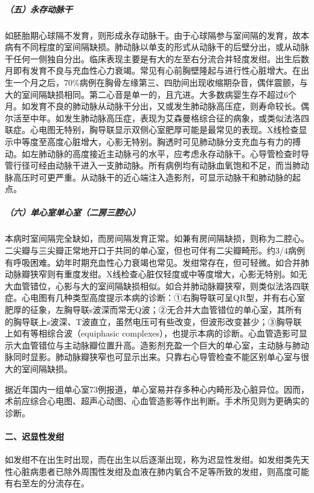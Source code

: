 \subparagraph{（五）永存动脉干}

如胚胎期心球隔不发育，则形成永存动脉干。由于心球隔参与室间隔的发育，故本病有不同程度的室间隔缺损。肺动脉以单支的形式从动脉干的后壁分出，或从动脉干任何一侧独自分出。临床表现主要是有大的左至右分流合并轻度发绀。出生后数月即有发育不良与充血性心力衰竭。常见有心前胸壁隆起与进行性心脏增大。在出生一个月之后，70\%病例在胸骨左缘第三、四肋间出现收缩期杂音，偶伴震颤，与大的室间隔缺损相同。第二心音是单一的，且亢进。大多数病婴生存不超过6个月。如发育不良的肺动脉从动脉干分出，又或发生肺动脉高压症，则寿命较长。偶尔活至中年。如发生肺动脉高压症，表现为艾森曼格综合征的病象，或类似法洛四联症。心电图无特别，胸导联显示双侧心室肥厚可能是最常见的表现。X线检查显示中等度至高度心脏增大，心影无特别。胸透时可见肺动脉分支充血与有力的搏动。如左肺动脉的高度接近主动脉弓的水平，应考虑永存动脉干。心导管检查时导管行径可经由动脉干进入一支肺动脉。所有病例均有动脉血氧饱和不足，而当肺动脉高压时可更严重。从动脉干的近心端注入造影剂，可显示动脉干和肺动脉的起点。

\subparagraph{（六）单心室单心室（二房三腔心）}

本病时室间隔完全缺如，而房间隔发育正常。如兼有房间隔缺损，则称为二腔心。二尖瓣与三尖瓣正常地开口于共同的单心室，但也可伴有二尖瓣畸形。约3/4病例有呼吸困难。幼年时期充血性心力衰竭也常见。发绀常存在，但可轻微。如合并肺动脉瓣狭窄则有重度发绀。X线检查心脏仅轻度或中等度增大，心影无特别。如无大血管错位，心影与大的室间隔缺损相似。如合并肺动脉瓣狭窄，则类似法洛四联症。心电图有几种类型高度提示本病的诊断：①右胸导联可呈QR型，并有右心室肥厚的征象，左胸导联s波深而常无Q波；②无合并大血管错位的单心室，其所有的胸导联上s波深、T波直立，虽然电压可有些改变，但波形改变甚少；③胸导联上如有等相综合波（equiphasic
complexes），也提示本病的诊断。心血管造影可显示大血管错位与主动脉瓣位置升高。造影剂充盈一个巨大的单心室，主动脉与肺动脉同时显影。肺动脉瓣狭窄也可显示出来。只靠右心导管检查不能区别单心室与很大的室间隔缺损。

据近年国内一组单心室73例报道，单心室易并存多种心内畸形及心脏异位。因而，术前应综合心电图、超声心动图、心血管造影等作出判断。手术所见则为更确实的诊断。

\paragraph{二、迟显性发绀}

如发绀不在出生时出现，而在出生以后逐渐出现，称为迟显性发绀。如发绀类先天性心脏病患者已除外周围性发绀及血液在肺内氧合不足等所致的发绀，则高度可能有右至左的分流存在。

